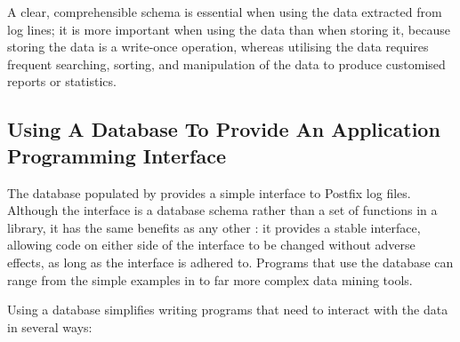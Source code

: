 A clear, comprehensible schema is essential when using the data extracted
from log lines; it is more important when using the data than when storing
it, because storing the data is a write-once operation, whereas utilising
the data requires frequent searching, sorting, and manipulation of the data
to produce customised reports or statistics.

\subsection{Using A Database To Provide An Application Programming Interface}

\label{database as API}

The database populated by \parsername{} provides a simple interface to
Postfix log files.  Although the interface is a database schema rather than
a set of functions in a library, it has the same benefits as any other
: it provides a stable interface, allowing code on either side
of the interface to be changed without adverse effects, as long as the
interface is adhered to.  Programs that use the database can range from the
simple examples in  to far more complex data mining
tools.

Using a database simplifies writing programs that need to interact with the
data in several ways:

